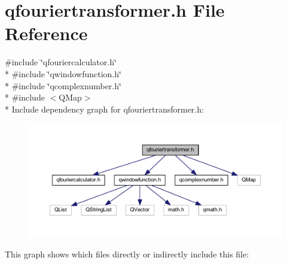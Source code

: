 \hypertarget{a00122}{\section{qfouriertransformer.\+h File Reference}
\label{a00122}
}
{\ttfamily \#include \char`\"{}qfouriercalculator.\+h\char`\"{}}\\*
{\ttfamily \#include \char`\"{}qwindowfunction.\+h\char`\"{}}\\*
{\ttfamily \#include \char`\"{}qcomplexnumber.\+h\char`\"{}}\\*
{\ttfamily \#include $<$Q\+Map$>$}\\*
Include dependency graph for qfouriertransformer.\+h\+:
\nopagebreak
\begin{figure}[H]
\begin{center}
\leavevmode
\includegraphics[width=350pt]{d8/df7/a00331}
\end{center}
\end{figure}
This graph shows which files directly or indirectly include this file\+:
\nopagebreak
